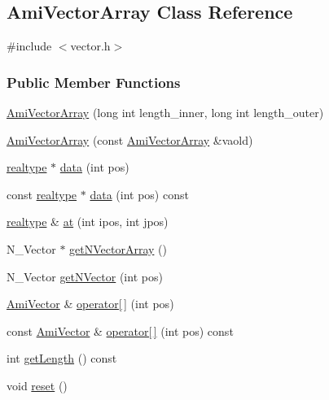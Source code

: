 \hypertarget{classamici_1_1_ami_vector_array}{}\subsection{Ami\+Vector\+Array Class Reference}
\label{classamici_1_1_ami_vector_array}


{\ttfamily \#include $<$vector.\+h$>$}

\subsubsection*{Public Member Functions}
\begin{DoxyCompactItemize}
\item 
\mbox{\hyperlink{classamici_1_1_ami_vector_array_a331a7814672b817a7c38328e78eaaedd}{Ami\+Vector\+Array}} (long int length\+\_\+inner, long int length\+\_\+outer)
\item 
\mbox{\hyperlink{classamici_1_1_ami_vector_array_a3b40abc4d3e4fc0a097834dd56666f41}{Ami\+Vector\+Array}} (const \mbox{\hyperlink{classamici_1_1_ami_vector_array}{Ami\+Vector\+Array}} \&vaold)
\item 
\mbox{\hyperlink{namespaceamici_a1bdce28051d6a53868f7ccbf5f2c14a3}{realtype}} $\ast$ \mbox{\hyperlink{classamici_1_1_ami_vector_array_a5c1b7077b31d3a3be1370ea3e42d13a3}{data}} (int pos)
\item 
const \mbox{\hyperlink{namespaceamici_a1bdce28051d6a53868f7ccbf5f2c14a3}{realtype}} $\ast$ \mbox{\hyperlink{classamici_1_1_ami_vector_array_a862fe8497e94d2fac86e92a07db04cd7}{data}} (int pos) const
\item 
\mbox{\hyperlink{namespaceamici_a1bdce28051d6a53868f7ccbf5f2c14a3}{realtype}} \& \mbox{\hyperlink{classamici_1_1_ami_vector_array_a214f110ad614eb97ec2c6f3b6a9f2c8c}{at}} (int ipos, int jpos)
\item 
N\+\_\+\+Vector $\ast$ \mbox{\hyperlink{classamici_1_1_ami_vector_array_a5ccad03e89676a4b404322899579f961}{get\+N\+Vector\+Array}} ()
\item 
N\+\_\+\+Vector \mbox{\hyperlink{classamici_1_1_ami_vector_array_a387bfb58f20388d99da7f946a3a27ab8}{get\+N\+Vector}} (int pos)
\item 
\mbox{\hyperlink{classamici_1_1_ami_vector}{Ami\+Vector}} \& \mbox{\hyperlink{classamici_1_1_ami_vector_array_a337287b17e675970226a55ae63ad65a2}{operator\mbox{[}$\,$\mbox{]}}} (int pos)
\item 
const \mbox{\hyperlink{classamici_1_1_ami_vector}{Ami\+Vector}} \& \mbox{\hyperlink{classamici_1_1_ami_vector_array_a45a615cf5e4b550783ee23560c834941}{operator\mbox{[}$\,$\mbox{]}}} (int pos) const
\item 
int \mbox{\hyperlink{classamici_1_1_ami_vector_array_a5f00d4dc3e7866d193ce926f35542801}{get\+Length}} () const
\item 
void \mbox{\hyperlink{classamici_1_1_ami_vector_array_ad20897c5c8bd47f5d4005989bead0e55}{reset}} ()
\end{DoxyCompactItemize}


